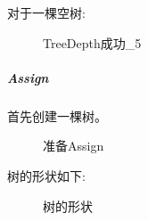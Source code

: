 \documentclass[supercite]{Experimental_Report}
\theoremstyle{definition}
\begin{document}
\clearpage
\noindent
对于一棵空树:
\begin{figure}[htbp]
	\centering
	\centering
	\caption{TreeDepth成功\_5}
	\label{fig5-14}
\end{figure}

\subparagraph{Assign}
\noindent
首先创建一棵树。
\begin{figure}[htbp]
	\centering
	\centering
	\caption{准备Assign}
	\label{fig5-15}
\end{figure}

\clearpage
\noindent
树的形状如下:
\begin{figure}[htbp]
	\centering
	\centering
	\caption{树的形状}
	\label{fig5-16}
\end{figure}
\end{document}
